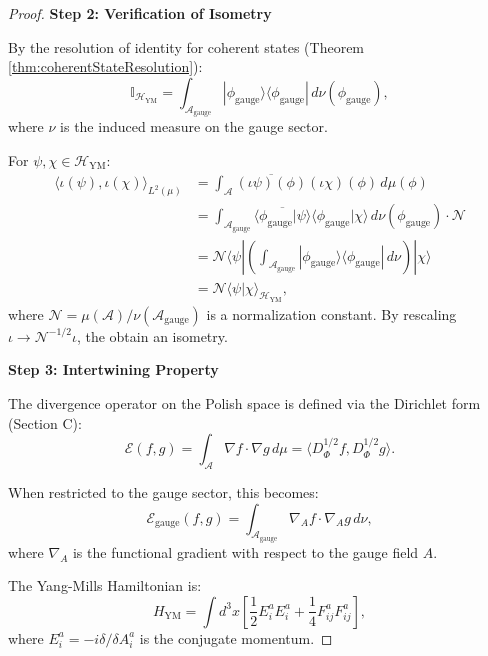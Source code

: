 \begin{theorem}
\begin{proof}
\textbf{Step 2: Verification of Isometry}

By the resolution of identity for coherent states (Theorem \ref{thm:coherentStateResolution}):
\begin{equation}
\mathbb{I}_{\mathcal{H}_{\mathrm{YM}}} = \int_{\mathcal{A}_{\mathrm{gauge}}} |\phi_{\mathrm{gauge}}\rangle \langle \phi_{\mathrm{gauge}}| \, d\nu(\phi_{\mathrm{gauge}}),
\end{equation}
where $\nu$ is the induced measure on the gauge sector.

For $\psi, \chi \in \mathcal{H}_{\mathrm{YM}}$:
\begin{align}
\langle \iota(\psi), \iota(\chi) \rangle_{L^2(\mu)} &= \int_{\mathcal{A}} \overline{(\iota \psi)(\phi)} (\iota \chi)(\phi) \, d\mu(\phi) \\
&= \int_{\mathcal{A}_{\mathrm{gauge}}} \overline{\langle \phi_{\mathrm{gauge}} | \psi \rangle} \langle \phi_{\mathrm{gauge}} | \chi \rangle \, d\nu(\phi_{\mathrm{gauge}}) \cdot \mathcal{N} \\
&= \mathcal{N} \langle \psi | \left( \int_{\mathcal{A}_{\mathrm{gauge}}} |\phi_{\mathrm{gauge}}\rangle \langle \phi_{\mathrm{gauge}}| \, d\nu \right) | \chi \rangle \\
&= \mathcal{N} \langle \psi | \chi \rangle_{\mathcal{H}_{\mathrm{YM}}},
\end{align}
where $\mathcal{N} = \mu(\mathcal{A})/\nu(\mathcal{A}_{\mathrm{gauge}})$ is a normalization constant. By rescaling $\iota \to \mathcal{N}^{-1/2} \iota$, the obtain an isometry.

\textbf{Step 3: Intertwining Property}

The divergence operator on the Polish space is defined via the Dirichlet form (Section C):
\begin{equation}
\mathcal{E}(f, g) = \int_{\mathcal{A}} \nabla f \cdot \nabla g \, d\mu = \langle D_\Phi^{1/2} f, D_\Phi^{1/2} g \rangle.
\end{equation}

When restricted to the gauge sector, this becomes:
\begin{equation}
\mathcal{E}_{\mathrm{gauge}}(f, g) = \int_{\mathcal{A}_{\mathrm{gauge}}} \nabla_A f \cdot \nabla_A g \, d\nu,
\end{equation}
where $\nabla_A$ is the functional gradient with respect to the gauge field $A$.

The Yang-Mills Hamiltonian is:
\begin{equation}
H_{\mathrm{YM}} = \int d^3x \left[ \frac{1}{2} E_i^a E_i^a + \frac{1}{4} F_{ij}^a F_{ij}^a \right],
\end{equation}
where $E_i^a = -i \delta/\delta A_i^a$ is the conjugate momentum.


\end{proof}
\end{theorem}
